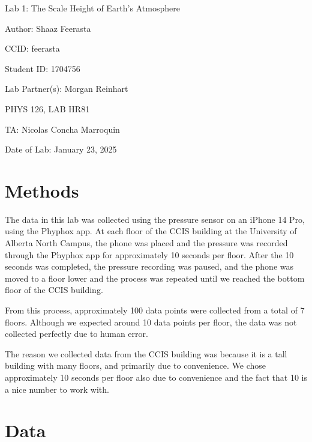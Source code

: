 \documentclass{article}
\begin{document}
\pagebreak
\hspace{0pt}
\vfill
\begin{center}
    Lab 1: The Scale Height of Earth's Atmosphere

    Author: Shaaz Feerasta

    CCID: feerasta

    Student ID: 1704756

    Lab Partner(s): Morgan Reinhart

    PHYS 126, LAB HR81

    TA: Nicolas Concha Marroquin

    Date of Lab: January 23, 2025

\end{center}
\vfill
\hspace{0pt}
\pagebreak

\section{Methods}

The data in this lab was collected using the pressure sensor on an iPhone 14 Pro, using the Phyphox app.
At each floor of the CCIS building at the University of Alberta North Campus, the phone was placed
and the pressure was recorded through the Phyphox app for approximately 10 seconds per floor.
After the 10 seconds was completed, the pressure recording was paused, and the phone was moved to a floor lower
and the process was repeated until we reached the bottom floor of the CCIS building.

From this process, approximately 100 data points were collected from a total of 7 floors.
Although we expected around 10 data points per floor, the data was not collected perfectly due to human error.

The reason we collected data from the CCIS building was because it is a tall building with many floors,
and primarily due to convenience. We chose approximately 10 seconds per floor also due to convenience and
the fact that 10 is a nice number to work with.

\section{Data}
\end{document}
